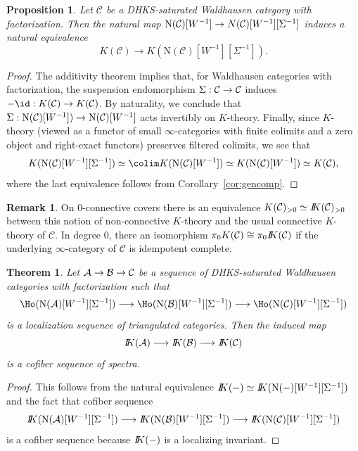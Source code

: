 \documentclass{amsart}
\renewcommand{\to}{\mathchoice{\longrightarrow}{\rightarrow}{\rightarrow}{\rightarrow}}
\let\catsymbfont\mathcal
\newcommand{\aA}{{\catsymbfont{A}}}
\newcommand{\aB}{{\catsymbfont{B}}}
\newcommand{\aC}{{\catsymbfont{C}}}
\newcommand{\bbK}{I\mspace{-6.mu}K}
\newcommand{\N}{\mathrm{N}}
\newcommand{\too}{\longrightarrow}%
\renewcommand{\i}{\infty}
\numberwithin{equation}{section}
\newtheorem{theorem}[equation]{Theorem}
\newtheorem{proposition}[equation]{Proposition}
\theoremstyle{definition}
\newtheorem{remark}[equation]{Remark}
\begin{document}
\begin{proposition}\label{prop:connconsistency}
Let $\aC$ be a DHKS-saturated Waldhausen category with factorization.
Then the natural map $\N(\aC)[W^{-1}]\to\\N(\aC)[W^{-1}][\Sigma^{-1}]$
induces a natural equivalence 
\[
K(\aC)\too K(\N(\aC)[W^{-1}][\Sigma^{-1}]).
\]
\end{proposition}

\begin{proof}
The additivity theorem implies that, for Waldhausen categories with
factorization, the suspension endomorphism $\Sigma:\aC\to\aC$ induces
$-\id:K(\aC)\to K(\aC)$.  By naturality, we conclude that
$\Sigma:\N(\aC)[W^{-1}])\to\N(\aC)[W^{-1}]$ acts invertibly on
$K$-theory. Finally, since $K$-theory (viewed as a functor of small
$\infty$-categories with finite colimits and a zero object and
right-exact functors) preserves filtered colimits, we see that 
\[
K(\N(\aC)[W^{-1}][\Sigma^{-1}])\simeq\colim K(\N(\aC)[W^{-1}])\simeq
K(\N(\aC)[W^{-1}])\simeq K(\aC), 
\]
where the last equivalence follows from Corollary~\ref{cor:gencomp}.
\end{proof}

\begin{remark}
On $0$-connective covers there is an equivalence
$K(\aC)_{>0}\simeq \bbK(\aC)_{>0}$ between this notion of
non-connective $K$-theory and the usual connective $K$-theory of
$\aC$.  In degree $0$, there an isomorphism $\pi_0
K(\aC)\cong\pi_0\bbK(\aC)$ if the underlying $\i$-category of $\aC$ is
idempotent complete. 
\end{remark}

\begin{theorem}\label{thm:localization}
Let $\aA\to\aB\to\aC$ be a sequence of DHKS-saturated Waldhausen categories with factorization such that
\[
\Ho(\N(\aA)[W^{-1}][\Sigma^{-1}])\too\Ho(\N(\aB)[W^{-1}][\Sigma^{-1}])\too\Ho(\N(\aC)[W^{-1}][\Sigma^{-1}])
\]
is a localization sequence of triangulated categories.
Then the induced map
\[
\bbK(\aA)\too\bbK(\aB)\too\bbK(\aC)
\]
is a cofiber sequence of spectra.
\end{theorem}

\begin{proof}
This follows from the natural equivalence $\bbK(-)\simeq\bbK(\N(-)[W^{-1}][\Sigma^{-1}])$ and the fact that cofiber sequence
\[
\bbK(\N(\aA)[W^{-1}][\Sigma^{-1}])\too\bbK(\N(\aB)[W^{-1}][\Sigma^{-1}])\too\bbK(\N(\aC)[W^{-1}][\Sigma^{-1}])
\]
is a cofiber sequence because $\bbK(-)$ is a localizing invariant.
\end{proof}
\end{document}
